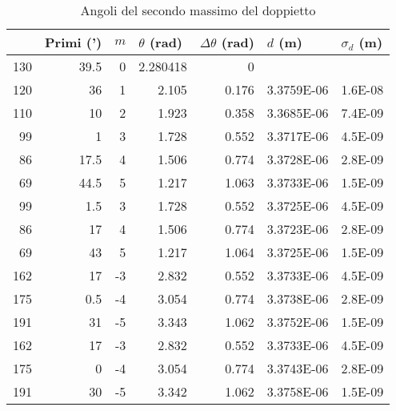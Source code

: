 \documentclass[a4paper,10pt]{article}
\begin{document}
	\begin{table}[htbp]
  \centering
  \caption{Angoli del secondo massimo del doppietto}
  	\medskip
    \begin{tabular}{rrrrrrr}
    \bottomrule
    \rowcolor[rgb]{ .267,  .447,  .769} \multicolumn{1}{l}{\textcolor[rgb]{ 1,  1,  1}{\textbf{Gradi (deg)}}} & \multicolumn{1}{l}{\textcolor[rgb]{ 1,  1,  1}{\textbf{Primi (')}}} & \multicolumn{1}{l}{\textcolor[rgb]{ 1,  1,  1}{\textbf{$m$}}} & \multicolumn{1}{l}{\textcolor[rgb]{ 1,  1,  1}{\textbf{$\theta$ (rad)}}} & \multicolumn{1}{l}{\textcolor[rgb]{ 1,  1,  1}{\textbf{$\Delta \theta$ (rad)}}} & \multicolumn{1}{l}{\textcolor[rgb]{ 1,  1,  1}{\textbf{$d$ (m)}}} & \multicolumn{1}{l}{\textcolor[rgb]{ 1,  1,  1}{\textbf{$\sigma _d$ (m)}}} \\
    \toprule
    \rowcolor[rgb]{ .851,  .851,  .851} 130   & 39.5  & 0     & 2.280418 & 0     &       &  \\
    120   & 36    & 1     & 2.105 & 0.176 & 3.3759E-06 & 1.6E-08 \\
    \rowcolor[rgb]{ .851,  .851,  .851} 110   & 10    & 2     & 1.923 & 0.358 & 3.3685E-06 & 7.4E-09 \\
    99    & 1     & 3     & 1.728 & 0.552 & 3.3717E-06 & 4.5E-09 \\
    \rowcolor[rgb]{ .851,  .851,  .851} 86    & 17.5  & 4     & 1.506 & 0.774 & 3.3728E-06 & 2.8E-09 \\
    69    & 44.5  & 5     & 1.217 & 1.063 & 3.3733E-06 & 1.5E-09 \\
    \rowcolor[rgb]{ .851,  .851,  .851} 99    & 1.5   & 3     & 1.728 & 0.552 & 3.3725E-06 & 4.5E-09 \\
    86    & 17    & 4     & 1.506 & 0.774 & 3.3723E-06 & 2.8E-09 \\
    \rowcolor[rgb]{ .851,  .851,  .851} 69    & 43    & 5     & 1.217 & 1.064 & 3.3725E-06 & 1.5E-09 \\
    162   & 17    & -3    & 2.832 & 0.552 & 3.3733E-06 & 4.5E-09 \\
    \rowcolor[rgb]{ .851,  .851,  .851} 175   & 0.5   & -4    & 3.054 & 0.774 & 3.3738E-06 & 2.8E-09 \\
    191   & 31    & -5    & 3.343 & 1.062 & 3.3752E-06 & 1.5E-09 \\
    \rowcolor[rgb]{ .851,  .851,  .851} 162   & 17    & -3    & 2.832 & 0.552 & 3.3733E-06 & 4.5E-09 \\
    175   & 0     & -4    & 3.054 & 0.774 & 3.3743E-06 & 2.8E-09 \\
    \rowcolor[rgb]{ .851,  .851,  .851} 191   & 30    & -5    & 3.342 & 1.062 & 3.3758E-06 & 1.5E-09 \\
    \toprule
    \end{tabular}%
  \label{tab2}%
\end{table}%
\end{document}
